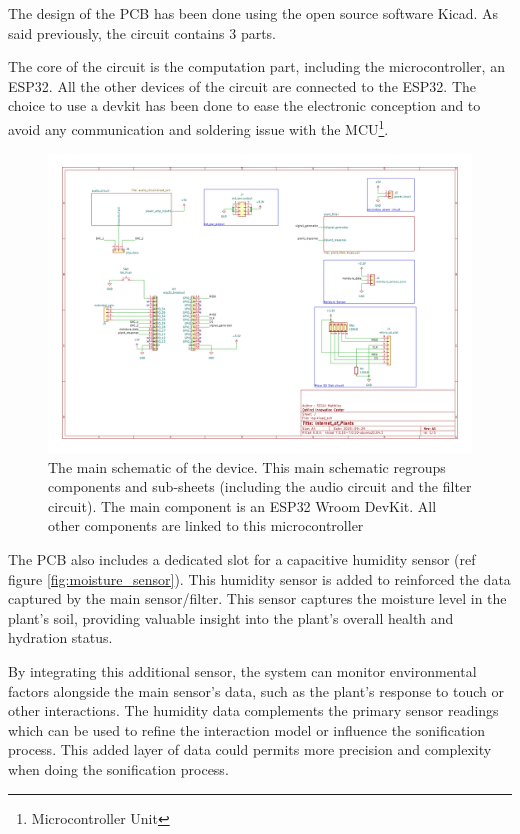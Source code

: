 The design of the PCB has been done using the open source software Kicad.
As said previously, the circuit contains 3 parts.

The core of the circuit is the computation part, including the microcontroller, an ESP32. All the other
devices of the circuit are connected to the ESP32. The choice to use a devkit has been done
to ease the electronic conception and to avoid any communication and soldering issue with the MCU\footnote[1]{Microcontroller Unit}.

\begin{figure}[h!]
    \centering
    \includegraphics[width=\textwidth]{images/iop.pdf}
    \caption{The main schematic of the device. This main schematic regroups components and sub-sheets (including the audio circuit
        and the filter circuit). The main component is an ESP32 Wroom DevKit. All other components are linked to this microcontroller}
    \vspace{0.1cm}
    \label{fig:iop_schematic_main}
\end{figure}


The PCB also includes a dedicated slot for a capacitive humidity sensor (ref figure \ref{fig:moisture_sensor}). This humidity sensor is added to reinforced the data captured by the main sensor/filter. This sensor captures the moisture level in the plant's soil, providing valuable insight into the plant's overall health and hydration status.

By integrating this additional sensor, the system can monitor environmental factors alongside the main sensor's data, such as the plant's response to touch or other interactions. The humidity data complements the primary sensor readings which can be used to refine the interaction model or influence the sonification process. This added layer of data could permits more precision and complexity when doing the sonification process.

